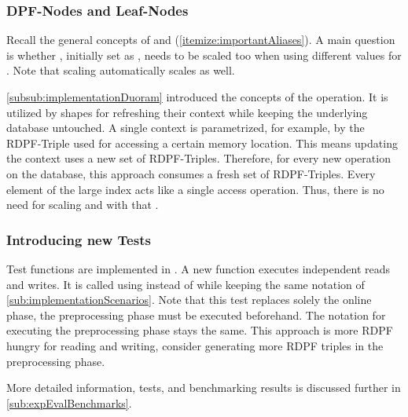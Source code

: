 \subsubsection*{DPF-Nodes and Leaf-Nodes}\label{subsub:largerRegisterTypeDPFNodesAndLeafLabels}
Recall the general concepts of  and  (\ref{itemize:importantAliases}).
A main question is whether , initially set as , needs to be scaled too when using different values for .
Note that scaling  automatically scales  as well.

\ref{subsub:implementationDuoram} introduced the concepts of the  operation.
It is utilized by shapes for refreshing their context while keeping the underlying database untouched.
A single context is parametrized, for example, by the RDPF-Triple used for accessing a certain memory location.
This means updating the context uses a new set of RDPF-Triples.
Therefore, for every new operation on the database, this approach consumes a fresh set of RDPF-Triples.
Every element of the large index acts like a single access operation.
Thus, there is no need for scaling  and with that .

\subsubsection*{Introducing new Tests} \label{subsub:IntroducingNewTests}
Test functions are implemented in .
A new function  executes independent reads and writes.
It is called using  instead of  while keeping the same notation of \ref{sub:implementationScenarios}.
Note that this test replaces solely the online phase, the preprocessing phase must be executed beforehand.
The notation for executing the preprocessing phase stays the same.
This approach is more RDPF hungry for reading and writing, consider generating more RDPF triples in the preprocessing phase.

More detailed information, tests, and benchmarking results is discussed further in \ref{sub:expEvalBenchmarks}.